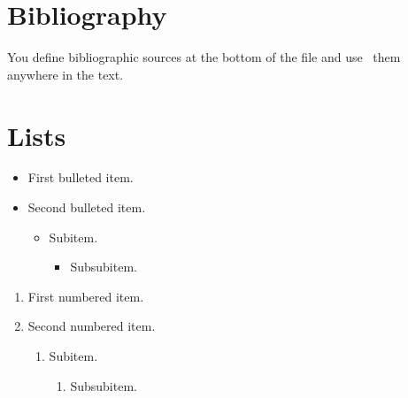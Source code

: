 \documentclass[10pt]{article}
\begin{document}
\section{Bibliography}

You define bibliographic sources at the bottom of the file and
use~\cite{lamport94,goossens93} them anywhere in the text.

\section{Lists}

\begin{itemize}

\item First bulleted item.

\item Second bulleted item.

    \begin{itemize}

    \item Subitem.

        \begin{itemize}

        \item Subsubitem.

        \end{itemize}

    \end{itemize}

\end{itemize}


\begin{enumerate}

\item First numbered item.

\item Second numbered item.

    \begin{enumerate}

    \item Subitem.

        \begin{enumerate}

        \item Subsubitem.

        \end{enumerate}

    \end{enumerate}

\end{enumerate}
\end{document}
